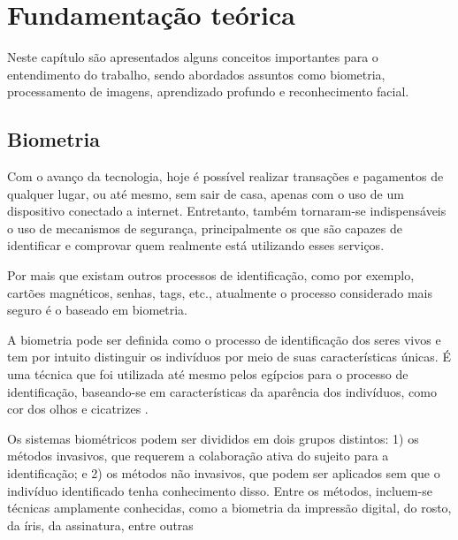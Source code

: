 \chapter{Fundamentação te\'orica}\label{cap:referencialTeorico}

Neste capítulo são apresentados alguns conceitos importantes para o entendimento
do trabalho, sendo abordados assuntos como biometria, processamento de imagens, aprendizado 
profundo e reconhecimento facial.

\section{Biometria}\label{sec:biometria}

Com o avanço da tecnologia, hoje é possível realizar transações e pagamentos 
de qualquer lugar, ou até mesmo, sem sair de casa, apenas com o uso de 
um dispositivo conectado a internet. Entretanto, também tornaram-se indispensáveis 
o uso de mecanismos de segurança, principalmente os que são capazes de identificar 
e comprovar quem realmente está utilizando esses serviços.

Por mais que existam outros processos de identificação, como por exemplo, cartões 
magnéticos, senhas, tags, etc., atualmente o processo considerado mais seguro é 
o baseado em biometria.

A biometria pode ser definida como o processo de identificação 
dos seres vivos e tem por intuito distinguir os indivíduos por meio 
de suas características únicas. É uma técnica que foi utilizada até mesmo pelos egípcios 
para o processo de identificação, baseando-se em características da
aparência dos indivíduos, como cor dos olhos e cicatrizes \cite{santos2007}.

Os sistemas biométricos podem ser divididos em dois grupos distintos: 
1) os métodos invasivos, que requerem a colaboração ativa do sujeito 
para a identificação; e 2) os métodos não invasivos, que podem ser 
aplicados sem que o indivíduo identificado tenha conhecimento disso. 
Entre os métodos, incluem-se técnicas amplamente conhecidas, 
como a biometria da impressão digital, do rosto, da íris, da assinatura, 
entre outras \cite{teixeira2011}

